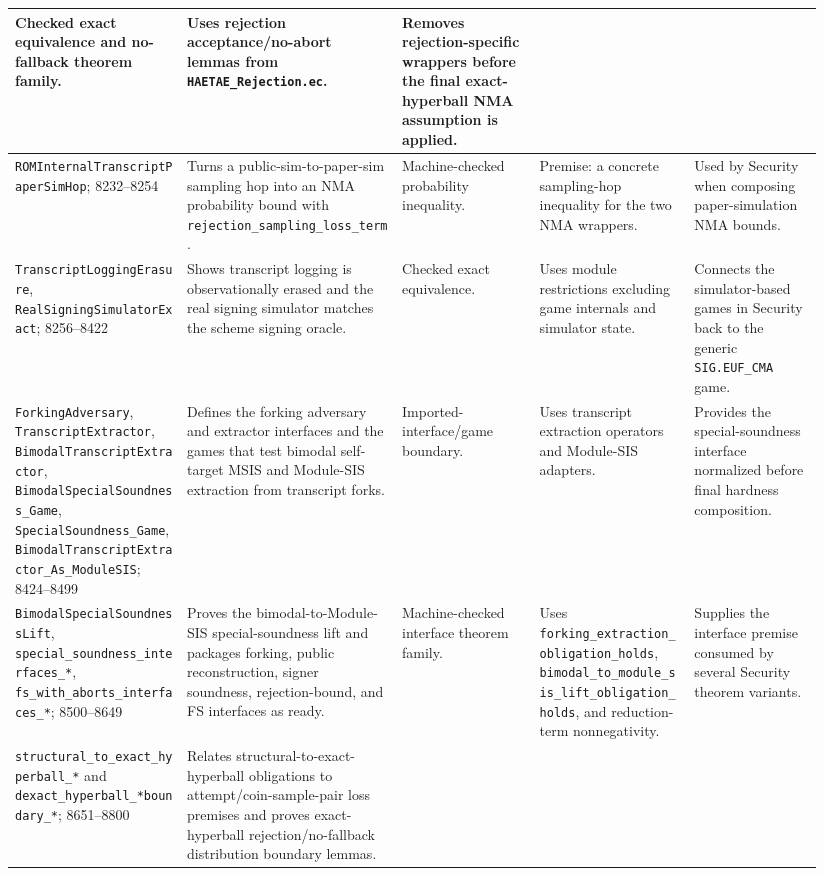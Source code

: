 \documentclass[11pt]{report}
\DeclareRobustCommand{\file}[1]{\ifmmode\text{\nolinkurl{#1}}\else\nolinkurl{#1}\fi}
\DeclareRobustCommand{\ec}[1]{\ifmmode\text{\nolinkurl{#1}}\else\nolinkurl{#1}\fi}
\theoremstyle{definition}
\theoremstyle{plain}
\begin{document}
{\begin{longtable}{p{0.20\linewidth}p{0.25\linewidth}p{0.16\linewidth}p{0.18\linewidth}p{0.15\linewidth}}
Checked exact equivalence and no-fallback theorem family. &
Uses rejection acceptance/no-abort lemmas from \file{HAETAE\_Rejection.ec}. &
Removes rejection-specific wrappers before the final exact-hyperball NMA
assumption is applied. \\
\midrule
\ec{ROMInternalTranscriptPaperSimHop}; 8232--8254 &
Turns a public-sim-to-paper-sim sampling hop into an NMA probability bound with
\ec{rejection\_sampling\_loss\_term}. &
Machine-checked probability inequality. &
Premise: a concrete sampling-hop inequality for the two NMA wrappers. &
Used by Security when composing paper-simulation NMA bounds. \\
\midrule
\ec{TranscriptLoggingErasure}, \ec{RealSigningSimulatorExact}; 8256--8422 &
Shows transcript logging is observationally erased and the real signing
simulator matches the scheme signing oracle. &
Checked exact equivalence. &
Uses module restrictions excluding game internals and simulator state. &
Connects the simulator-based games in Security back to the generic
\ec{SIG.EUF\_CMA} game. \\
\midrule
\ec{ForkingAdversary}, \ec{TranscriptExtractor},
\ec{BimodalTranscriptExtractor}, \ec{BimodalSpecialSoundness\_Game},
\ec{SpecialSoundness\_Game},
\ec{BimodalTranscriptExtractor\_As\_ModuleSIS}; 8424--8499 &
Defines the forking adversary and extractor interfaces and the games that test
bimodal self-target MSIS and Module-SIS extraction from transcript forks. &
Imported-interface/game boundary. &
Uses transcript extraction operators and Module-SIS adapters. &
Provides the special-soundness interface normalized before final hardness
composition. \\
\midrule
\ec{BimodalSpecialSoundnessLift},
\ec{special\_soundness\_interfaces\_*},
\ec{fs\_with\_aborts\_interfaces\_*}; 8500--8649 &
Proves the bimodal-to-Module-SIS special-soundness lift and packages
forking, public reconstruction, signer soundness, rejection-bound, and FS
interfaces as ready. &
Machine-checked interface theorem family. &
Uses \ec{forking\_extraction\_obligation\_holds},
\ec{bimodal\_to\_module\_sis\_lift\_obligation\_holds}, and reduction-term
nonnegativity. &
Supplies the interface premise consumed by several Security theorem variants. \\
\midrule
\ec{structural\_to\_exact\_hyperball\_*} and
\ec{dexact\_hyperball\_*boundary\_*}; 8651--8800 &
Relates structural-to-exact-hyperball obligations to attempt/coin-sample-pair
loss premises and proves exact-hyperball rejection/no-fallback distribution
boundary lemmas. &

\end{longtable}}
\end{document}

